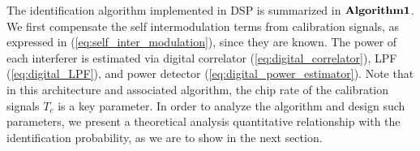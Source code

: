 \documentclass{IEEEtran}
\begin{document}

The identification algorithm implemented in DSP is summarized in $\bf{Algorithm 1}$. We first compensate the self intermodulation terms from calibration signals, as expressed in (\ref{eq:self_inter_modulation}), since they are known. The power of each interferer is estimated via digital correlator (\ref{eq:digital_correlator}), LPF (\ref{eq:digital_LPF}), and power detector (\ref{eq:digital_power_estimator}). Note that in this architecture and associated algorithm, the chip rate of the calibration signals $T_c$ is a key parameter. In order to analyze the algorithm and design such parameters, we present a theoretical analysis quantitative relationship with the identification probability, as we are to show in the next section.

%
%
\end{document}
